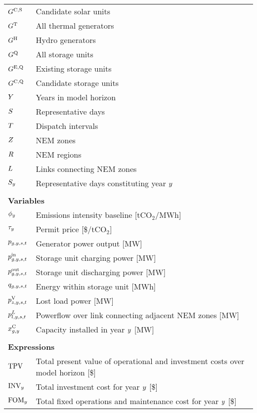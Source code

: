 \documentclass{article}
\begin{document}
\begin{longtable}{ p{}  p{}}
		$G^{\mathrm{C,S}}$ & Candidate solar units\\
		$G^{\mathrm{T}}$ & All thermal generators\\
		$G^{\mathrm{H}}$ & Hydro generators\\
		$G^{\mathrm{Q}}$ & All storage units\\
		$G^{\mathrm{E,Q}}$ & Existing storage units\\
		$G^{\mathrm{C,Q}}$ & Candidate storage units\\
		$Y$ & Years in model horizon\\
		$S$ & Representative days\\
		$T$ & Dispatch intervals\\
		$Z$ & NEM zones\\
		$R$ & NEM regions\\
		$L$ & Links connecting NEM zones\\
		$S_{y}$ & Representative days constituting year $y$\\
		& \\
		\multicolumn{2}{l}{\textbf{Variables}}\\
		$\phi_{y}$ & Emissions intensity baseline [tCO$_{2}$/MWh]\\
		$\tau_{y}$ & Permit price [\$/tCO$_{2}$]\\
		$p_{g,y,s,t}$ & Generator power output [MW]\\
		$p^{\mathrm{in}}_{g,y,s,t}$ & Storage unit charging power [MW]\\
		$p^{\mathrm{out}}_{g,y,s,t}$ & Storage unit discharging power [MW]\\
		$q_{g,y,s,t}$ & Energy within storage unit [MWh]\\
		$p^{\mathrm{V}}_{z,y,s,t}$ & Lost load power [MW]\\
		$p^{L}_{l,y,s,t}$ & Powerflow over link connecting adjacent NEM zones [MW]\\
		$x^{\mathrm{C}}_{g,y}$ & Capacity installed in year $y$ [MW]\\
		& \\
		\multicolumn{2}{l}{\textbf{Expressions}}\\
		$\mathrm{TPV}_{}$ & Total present value of operational and investment costs over model horizon [\$]\\
		$\mathrm{INV}_{y}$ & Total investment cost for year $y$ [\$]\\
		$\mathrm{FOM}_{y}$ & Total fixed operations and maintenance cost for year $y$ [\$]\\

\end{longtable}
\end{document}
